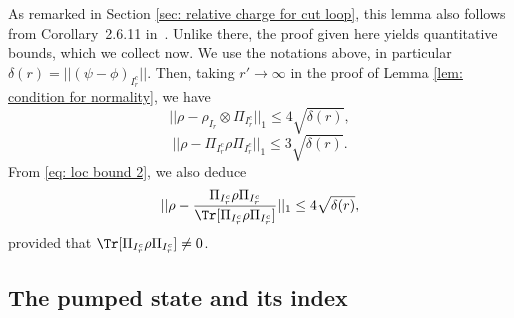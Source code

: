 As remarked in Section \ref{sec: relative charge for cut loop},  this lemma also follows from Corollary~2.6.11 in~\cite{BratRob}.  Unlike there, the proof given here yields quantitative bounds, which we collect now. We use the notations above, in particular $\delta(r)=||(\psi-\phi)_{{I_{r}^c}}||$. Then, taking $r'\to\infty$ in the proof of Lemma \ref{lem: condition for normality}, we have
\begin{equation} \label{eq: loc bound 1}
	||\rho-\rho_{I_r} \otimes \Pi_{I_{r}^c}||_1 \leq  4\sqrt{\delta(r)},
\end{equation}
\begin{equation}\label{eq: loc bound 2}
	||\rho- \Pi_{I_{r}^c}\rho \Pi_{I_{r}^c} ||_1 \leq  3\sqrt{\delta(r)}.
\end{equation}
From \eqref{eq: loc bound 2}, we also deduce 
\begin{equation} \label{eq: loc bound 3}
	||\rho- \frac{\Pi_{I_{r}^c}\rho \Pi_{I_{r}^c}}{\Tr[\Pi_{I_{r}^c}\rho \Pi_{I_{r}^c}]}||_1\leq    4 \sqrt{\delta(r)},  
\end{equation}
provided that $\Tr[\Pi_{I_{r}^c}\rho \Pi_{I_{r}^c}]\neq 0$. 




\subsection{The pumped state and its index}\label{sec: states cut loop}


